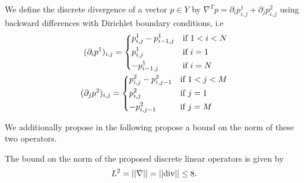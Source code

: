     \begin{definition} %
    \label{def:discrete_divergence_operator}

        We define the discrete divergence of a vector $p \in Y$ by $\nabla^{T} p = \partial_{i}p^{1}_{i, j} + \partial_{j}p^{2}_{i, j}$ using backward differences with Dirichlet boundary conditions, i.e
            \begin{eqnarray}
                (\partial_{i}p^{1})_{i, j} =
                    \begin{dcases*}
                        p^{1}_{i, j} - p^{1}_{i-1, j} & \textnormal{if $1 < i < N$}\\
                        p^{1}_{i, j} & \textnormal{if $i = 1$}\\
                        -p^{1}_{i-1, j} & \textnormal{if $i = N$}
                    \end{dcases*}
                \label{eq:backward_partial_i} \\
                (\partial_{j}p^{2})_{i, j} =
                    \begin{dcases*}
                        p^{2}_{i, j} - p^{2}_{i, j-1} & \textnormal{if $1 < j < M$}\\
                        p^{2}_{i, j} & \textnormal{if $j = 1$}\\
                        -p^{2}_{i, j-1} & \textnormal{if $j = M$}
                    \end{dcases*}
                \label{eq:backward_partial_j}
            \end{eqnarray}

    \end{definition}

    We additionally propose in the following propose a bound on the norm of these two operators.

    \begin{proposition} %
        \label{prop:bound_on_the_norm}

        The bound on the norm of the proposed discrete linear operators is given by
            \begin{equation}
                L^{2} = ||\nabla|| = ||\textnormal{div}|| \le 8.
            \end{equation}

    \end{proposition}

